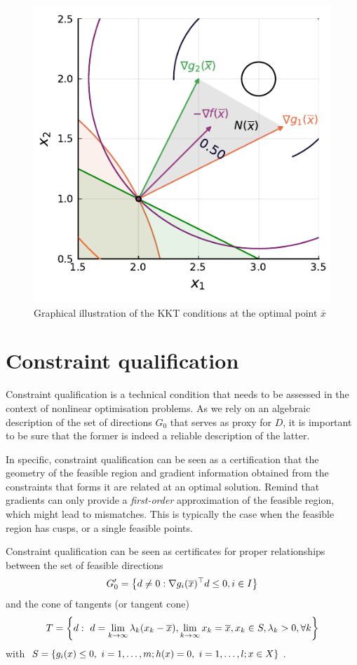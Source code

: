 \begin{figure}
	\includegraphics{part_2/chapter_7/figures/ex2_KKT.pdf}	
	\caption{Graphical illustration of the KKT conditions at the optimal point $\overline{x}$}\label{ex1_cone} 
\end{figure} 


\section{Constraint qualification}


Constraint qualification is a technical condition that needs to be assessed in the context of nonlinear optimisation problems. As we rely on an algebraic description of the set of directions $G_0$ that serves as proxy for $D$, it is important to be sure that the former is indeed a reliable description of the latter. 

In specific, constraint qualification can be seen as a certification that the geometry of the feasible region and gradient information obtained from the constraints that forms it are related at an optimal solution. Remind that gradients can only provide a \emph{first-order} approximation of the feasible region, which might lead to mismatches. This is typically the case when the feasible region has cusps, or a single feasible points. 

Constraint qualification can be seen as certificates for proper relationships between the set of feasible directions
\begin{align*}
G_0' = \left\{ d \neq 0: \nabla g_i (\overline{x})^\top d \leq 0, i \in I \right \}	
\end{align*}
%
and the cone of tangents (or tangent cone)
\begin{align}
	T = \left\{ d : \ d = \lim_{k \rightarrow \infty}\lambda_k(x_k - \overline{x}), \lim_{k \rightarrow \infty}x_k = \overline{x}, 
            x_k \in S, \lambda_k > 0, \forall k \right \} \label{eq:cone_tangents}
\end{align}
%
with $S = \left\{ g_i(x) \leq 0, \ i = 1, \dots, m; h(x) = 0, \ i = 1, \dots, l; x \in X \right \}$. 

